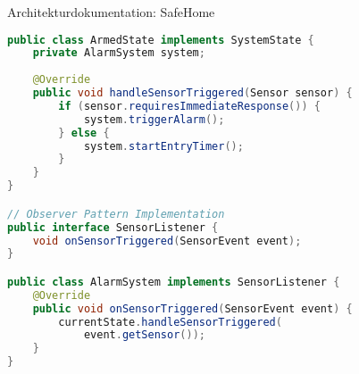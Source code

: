 \begin{example2}{Architekturdokumentation: SafeHome}
\begin{lstlisting}[language=Java, style=basesmol]
public class ArmedState implements SystemState {
    private AlarmSystem system;
    
    @Override
    public void handleSensorTriggered(Sensor sensor) {
        if (sensor.requiresImmediateResponse()) {
            system.triggerAlarm();
        } else {
            system.startEntryTimer();
        }
    }
}

// Observer Pattern Implementation
public interface SensorListener {
    void onSensorTriggered(SensorEvent event);
}

public class AlarmSystem implements SensorListener {
    @Override
    public void onSensorTriggered(SensorEvent event) {
        currentState.handleSensorTriggered(
            event.getSensor());
    }
}
\end{lstlisting}
\end{example2}

